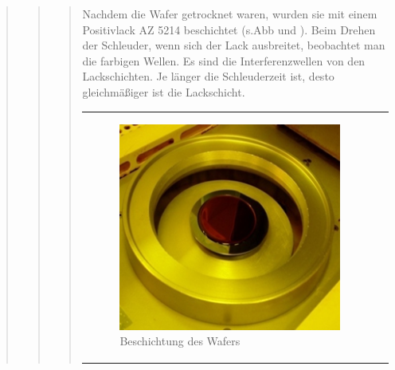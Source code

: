 \begin{quote}
\begin{quote}
\begin{quote}
			Nachdem die Wafer getrocknet waren, wurden sie mit einem Positivlack 
			AZ 5214 beschichtet (s.Abb  und ). Beim Drehen der Schleuder, wenn 
			sich der Lack ausbreitet, beobachtet man die farbigen Wellen. Es 
			sind die Interferenzwellen von den Lackschichten. Je länger die 
			Schleuderzeit ist, desto gleichmäßiger ist die Lackschicht.
    		
    		\vspace{2em}
    
    		\begin{center}
                \begin{tabular}{ll}

                \hspace{-14em}
                    \begin{minipage}{0.7\textwidth}
                        \begin{figure}[H]
                        \hspace{5em}
                            \includegraphics[scale=1.0, trim = 0cm 0cm 0cm
                            0cm, clip]{./HerstellungBilder/BeschichtungdesWafers.png}
                            \caption{Beschichtung des Wafers}
                           \label{fig:Beschwaf}
                        \end{figure}

                    \end{minipage}
                    \begin{minipage}{0.3\textwidth}


\end{minipage}
\end{tabular}
\end{center}
\end{quote}
\end{quote}
\end{quote}
